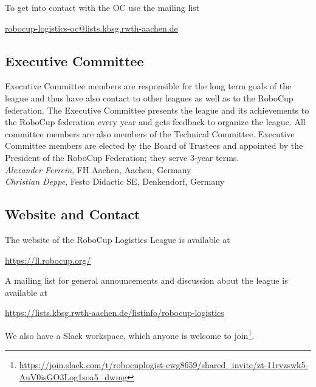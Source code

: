 \documentclass[12pt,twoside]{article}
\begin{document}
\medskip
\noindent To get into contact with the \ac{OC} use the mailing list\\
\centerline{\url{robocup-logistics-oc@lists.kbsg.rwth-aachen.de}}

\subsection{Executive Committee}
\label{sec:ec}
Executive Committee members are responsible for the long term goals of
the league and thus have also contact to other leagues as well as to
the RoboCup federation. The Executive Committee presents the league
and its achievements to the RoboCup federation every year and gets
feedback to organize the league. All committee members are also
members of the Technical Committee. Executive Committee members are
elected by the Board of Trustees and appointed by the President of the
RoboCup Federation; they serve 3-year terms.\\[.5em]
\emph{Alexander Ferrein}, FH Aachen, Aachen, Germany\\
\emph{Christian Deppe}, Festo Didactic SE, Denkendorf, Germany

\subsection{Website and Contact}
\label{sec:website-ml}
The website of the RoboCup Logistics League is available at\\
\centerline{\url{https://ll.robocup.org/}}

\smallskip
\noindent
A mailing list for general announcements and discussion about the
league is available at\\
\centerline{\url{https://lists.kbsg.rwth-aachen.de/listinfo/robocup-logistics}}

\smallskip
\noindent
We also have a Slack workspace, which anyone is welcome to
join\footnote{{\url{https://join.slack.com/t/robocuplogist-ewg8659/shared_invite/zt-11rvzswk5-AuV0isGO3Log1soa5_dwmg}}}. %

\end{document}
